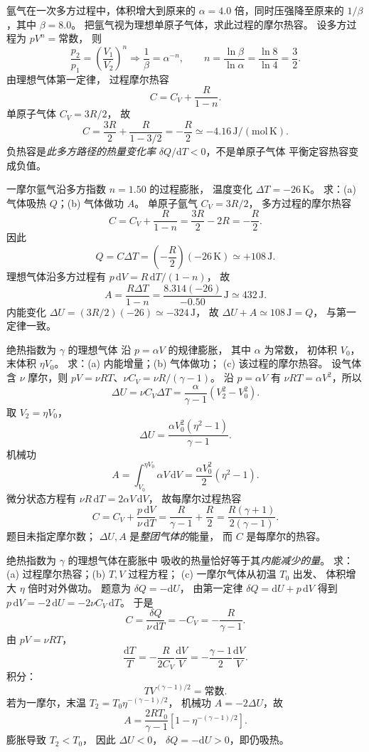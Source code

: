 氩气在一次多方过程中，体积增大到原来的
$\alpha=4.0$ 倍，同时压强降至原来的
$1/\beta$，其中 $\beta=8.0$。
把氩气视为理想单原子气体，求此过程的摩尔热容。
\exsolution
设多方过程为 $pV^n=\text{常数}$，
则
\[
\frac{p_2}{p_1}=\left(\frac{V_1}{V_2}\right)^n
\Longrightarrow \frac1\beta=\alpha^{-n},\qquad
n=\frac{\ln\beta}{\ln\alpha}
=\frac{\ln8}{\ln4}=\frac32.
\]
由理想气体第一定律，
过程摩尔热容
\[
C=C_V+\frac{R}{1-n}.
\]
单原子气体 $C_V=3R/2$，
故
\[
\boxed{C=\frac{3R}{2}+\frac{R}{1-3/2}
=-\frac R2\simeq-4.16\,\mathrm{J/(mol\,K)}}.
\]
\excheck 负热容是\emph{此多方路径的热量变化率}
$\delta Q/\mathrm dT<0$，不是单原子气体
平衡定容热容变成负值。

一摩尔氩气沿多方指数 $n=1.50$ 的过程膨胀，
温度变化 $\Delta T=-26\,\mathrm K$。
求：(a) 气体吸热 $Q$；(b) 气体做功 $A$。
\exsolution
单原子氩气 $C_V=3R/2$，
多方过程的摩尔热容
\[
C=C_V+\frac R{1-n}
=\frac{3R}{2}-2R=-\frac R2.
\]
因此
\[
\boxed{Q=C\Delta T
=\left(-\frac R2\right)(-26\,\mathrm K)
\simeq+108\,\mathrm J}.
\]
理想气体沿多方过程有
$p\,\mathrm dV=R\,\mathrm dT/(1-n)$，
故
\[
\boxed{A=\frac{R\Delta T}{1-n}
=\frac{8.314(-26)}{-0.50}\,\mathrm J
\simeq432\,\mathrm J}.
\]
\excheck 内能变化
$\Delta U=(3R/2)(-26)\simeq-324\,\mathrm J$，
故 $\Delta U+A\simeq108\,\mathrm J=Q$，
与第一定律一致。

绝热指数为 $\gamma$ 的理想气体
沿 $p=\alpha V$ 的规律膨胀，
其中 $\alpha$ 为常数，
初体积 $V_0$，末体积 $\eta V_0$。
求：(a) 内能增量；(b) 气体做功；
(c) 该过程的摩尔热容。
\exsolution
设气体含 $\nu$ 摩尔，则
$pV=\nu RT$、$\nu C_V=\nu R/(\gamma-1)$。
沿 $p=\alpha V$ 有
$\nu RT=\alpha V^2$，所以
\[
\Delta U=\nu C_V\Delta T
=\frac{\alpha}{\gamma-1}(V_2^2-V_0^2).
\]
取 $V_2=\eta V_0$，
\[
\boxed{\Delta U=
\frac{\alpha V_0^2(\eta^2-1)}{\gamma-1}}.
\]
机械功
\[
\boxed{A=\int_{V_0}^{\eta V_0}\alpha V\,\mathrm dV
=\frac{\alpha V_0^2}{2}(\eta^2-1)}.
\]
微分状态方程有
$\nu R\,\mathrm dT=2\alpha V\,\mathrm dV$，
故每摩尔过程热容
\[
C=C_V+\frac{p\,\mathrm dV}{\nu\,\mathrm dT}
=\frac R{\gamma-1}+\frac R2
=\boxed{\frac{R(\gamma+1)}{2(\gamma-1)}}.
\]
\excheck 题目未指定摩尔数；
$\Delta U,A$ 是\emph{整团气体的}能量，
而 $C$ 是每摩尔的热容。

绝热指数为 $\gamma$ 的理想气体在膨胀中
吸收的热量恰好等于其\emph{内能减少的量}。
求：(a) 过程摩尔热容；(b) $T,V$ 过程方程；
(c) 一摩尔气体从初温 $T_0$ 出发、
体积增大 $\eta$ 倍时对外做功。
\exsolution
题意为 $\delta Q=-\mathrm dU$，
由第一定律
$\delta Q=\mathrm dU+p\,\mathrm dV$
得到
$p\,\mathrm dV=-2\,\mathrm dU=-2\nu C_V\,\mathrm dT$。
于是
\[
\boxed{C=\frac{\delta Q}{\nu\,\mathrm dT}=-C_V
=-\frac R{\gamma-1}}.
\]
由 $pV=\nu RT$，
\[
\frac{\mathrm dT}{T}
=-\frac{R}{2C_V}\frac{\mathrm dV}{V}
=-\frac{\gamma-1}{2}\frac{\mathrm dV}{V}.
\]
积分：
\[
\boxed{TV^{(\gamma-1)/2}=\text{常数}}.
\]
若为一摩尔，末温
$T_2=T_0\eta^{-(\gamma-1)/2}$，
机械功 $A=-2\Delta U$，故
\[
\boxed{A=\frac{2RT_0}{\gamma-1}
\left[1-\eta^{-(\gamma-1)/2}\right]}.
\]
\excheck 膨胀导致 $T_2<T_0$，
因此 $\Delta U<0$，
$\delta Q=-\mathrm dU>0$，即仍吸热。

